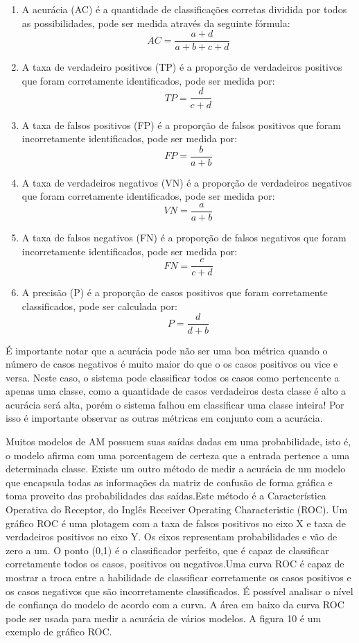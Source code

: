 \begin{enumerate}
\item A acurácia (AC) é a quantidade de classificações corretas dividida por todos as possibilidades, pode ser medida através da seguinte fórmula: 
 \[
       AC =  \frac{a + d}{a + b + c + d}
  \]

\item A taxa de verdadeiro positivos (TP) é a proporção de verdadeiros positivos que foram corretamente identificados, pode ser medida por:
 \[
       TP =  \frac{d}{ c + d}
  \]

\item A taxa de falsos positivos (FP) é a proporção de falsos positivos que foram incorretamente identificados, pode ser medida por:
 \[
       FP =  \frac{b}{ a + b}
  \]
  
\item A taxa de verdadeiros negativos (VN) é a proporção de verdadeiros negativos que foram corretamente identificados, pode ser medida por:
 \[
       VN =  \frac{a}{ a + b}
  \]
  
\item A taxa de falsos negativos (FN) é a proporção de falsos negativos que foram incorretamente identificados, pode ser medida por:
 \[
       FN =  \frac{c}{c + d}
  \]

\item A precisão (P) é a proporção de casos positivos que foram corretamente classificados, pode ser calculada por:
 \[
       P =  \frac{d}{d + b}
  \] 

\end{enumerate}

É importante notar que a acurácia pode não ser uma boa métrica quando o número de casos negativos é muito maior do que o os casos positivos ou vice e versa. Neste caso, o sistema pode classificar todos os casos como pertencente a apenas uma classe, como a quantidade de casos verdadeiros desta classe é alto a acurácia será alta, porém o sistema falhou em classificar uma classe inteira! Por isso é importante observar as outras métricas em conjunto com a acurácia.

Muitos modelos de AM possuem suas saídas dadas em uma probabilidade, isto é, o modelo afirma com uma porcentagem de certeza que a entrada pertence a uma determinada classe. Existe um outro método de medir a acurácia de um modelo que encapsula todas as informações da matriz de confusão de forma gráfica e toma proveito das probabilidades das saídas.Este método é a Característica Operativa do Receptor, do Inglês Receiver Operating Characteristic (ROC). Um gráfico ROC é uma plotagem com a taxa de falsos positivos no eixo X e taxa de verdadeiros positivos no eixo Y. Os eixos representam probabilidades e vão de zero a um. O ponto (0,1) é o classificador perfeito, que é capaz de classificar corretamente todos os casos, positivos ou negativos.Uma curva ROC é capaz de mostrar a troca entre a habilidade de classificar corretamente os casos positivos e os casos negativos que são incorretamente classificados. É possível  analisar o nível de confiança do modelo de acordo com a curva. A área em baixo da curva ROC pode ser usada para medir a acurácia de vários modelos. A figura 10 é um exemplo de gráfico ROC. 
  
